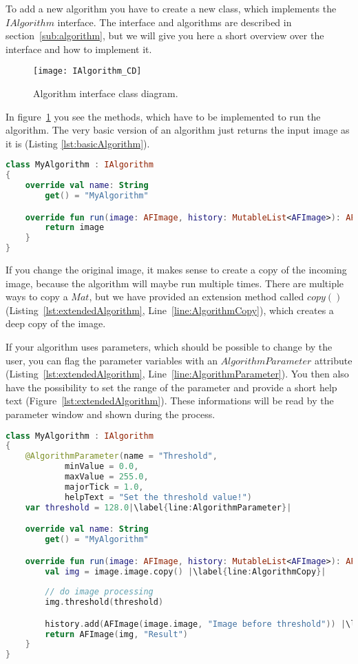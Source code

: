 To add a new algorithm you have to create a new class, which implements the $IAlgorithm$ interface. The interface and algorithms are described in section~\ref{sub:algorithm}, but we will give you here a short overview over the interface and how to implement it.

\begin{figure}[h]
  \centering
      \texttt{[image: IAlgorithm\_CD]}
  \caption{Algorithm interface class diagram.}
  \label{fig:IAlgorithm_CD_DG}
\end{figure}

In figure~\ref{fig:IAlgorithm_CD_DG} you see the methods, which have to be implemented to run the algorithm. The very basic version of an algorithm just returns the input image as it is (Listing \ref{lst:basicAlgorithm}).

\begin{lstlisting}[caption={Basic version of an algorithm.}, label={lst:basicAlgorithm}, language=Kotlin]
class MyAlgorithm : IAlgorithm
{
    override val name: String
        get() = "MyAlgorithm"

    override fun run(image: AFImage, history: MutableList<AFImage>): AFImage {
        return image
    }
}
\end{lstlisting}

If you change the original image, it makes sense to create a copy of the incoming image, because the algorithm will maybe run multiple times. There are multiple ways to copy a $Mat$, but we have provided an extension method called $copy()$ (Listing~\ref{lst:extendedAlgorithm}, Line~\ref{line:AlgorithmCopy}), which creates a deep copy of the image.

If your algorithm uses parameters, which should be possible to change by the user, you can flag the parameter variables with an $AlgorithmParameter$ attribute (Listing~\ref{lst:extendedAlgorithm}, Line~\ref{line:AlgorithmParameter}). You then also have the possibility to set the range of the parameter and provide a short help text (Figure~\ref{lst:extendedAlgorithm}). These informations will be read by the parameter window and shown during the process.

\begin{lstlisting}[caption={Extended version of an algorithm.}, label={lst:extendedAlgorithm}, language=Kotlin,escapechar=|]
class MyAlgorithm : IAlgorithm
{
    @AlgorithmParameter(name = "Threshold",
            minValue = 0.0,
            maxValue = 255.0,
            majorTick = 1.0,
            helpText = "Set the threshold value!")
    var threshold = 128.0|\label{line:AlgorithmParameter}|

    override val name: String
        get() = "MyAlgorithm"

    override fun run(image: AFImage, history: MutableList<AFImage>): AFImage {
        val img = image.image.copy() |\label{line:AlgorithmCopy}|
        
        // do image processing
        img.threshold(threshold)

        history.add(AFImage(image.image, "Image before threshold")) |\label{line:AlgorithmHistory}|
        return AFImage(img, "Result")
    }
}
\end{lstlisting}

